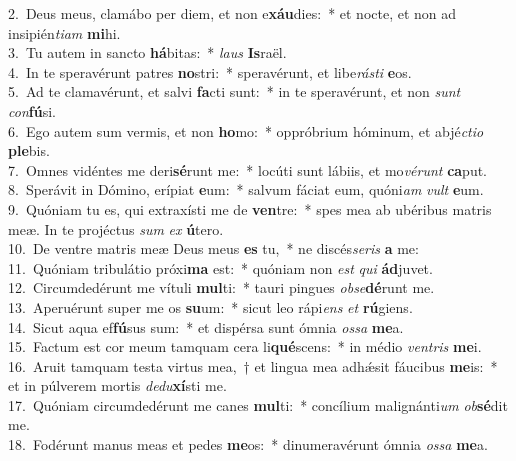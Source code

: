 {2.~}Deus meus, clamábo per diem, et non e\textbf{xáu}dies:~* et nocte, et non ad insipién\textit{ti}\textit{am} \textbf{mi}hi.\\
{3.~}Tu autem in sancto \textbf{há}bitas:~* \textit{laus} \textbf{Is}raël.\\
{4.~}In te speravérunt patres \textbf{no}stri:~* speravérunt, et libe\textit{rá}\textit{sti} \textbf{e}os.\\
{5.~}Ad te clamavérunt, et salvi \textbf{fa}cti sunt:~* in te speravérunt, et non \textit{sunt} \textit{con}\textbf{fú}si.\\
{6.~}Ego autem sum vermis, et non \textbf{ho}mo:~* oppróbrium hóminum, et abjé\textit{cti}\textit{o} \textbf{ple}bis.\\
{7.~}Omnes vidéntes me deri\textbf{sé}runt me:~* locúti sunt lábiis, et mo\textit{vé}\textit{runt} \textbf{ca}put.\\
{8.~}Sperávit in Dómino, erípiat \textbf{e}um:~* salvum fáciat eum, quóni\textit{am} \textit{vult} \textbf{e}um.\\
{9.~}Quóniam tu es, qui extraxísti me de \textbf{ven}tre:~* spes mea ab ubéribus matris meæ. In te projéctus \textit{sum} \textit{ex} \textbf{ú}tero.\\
{10.~}De ventre matris meæ Deus meus \textbf{es} tu,~* ne discés\textit{se}\textit{ris} \textbf{a} me:\\
{11.~}Quóniam tribulátio próxi\textbf{ma} est:~* quóniam non \textit{est} \textit{qui} \textbf{ád}juvet.\\
{12.~}Circumdedérunt me vítuli \textbf{mul}ti:~* tauri pingues \textit{ob}\textit{se}\textbf{dé}runt me.\\
{13.~}Aperuérunt super me os \textbf{su}um:~* sicut leo rápi\textit{ens} \textit{et} \textbf{rú}giens.\\
{14.~}Sicut aqua ef\textbf{fú}sus sum:~* et dispérsa sunt ómnia \textit{os}\textit{sa} \textbf{me}a.\\
{15.~}Factum est cor meum tamquam cera li\textbf{qué}scens:~* in médio \textit{ven}\textit{tris} \textbf{me}i.\\
{16.~}Aruit tamquam testa virtus mea,~† et lingua mea adhǽsit fáucibus \textbf{me}is:~* et in púlverem mortis \textit{de}\textit{du}\textbf{xí}sti me.\\
{17.~}Quóniam circumdedérunt me canes \textbf{mul}ti:~* concílium malignánti\textit{um} \textit{ob}\textbf{sé}dit me.\\
{18.~}Fodérunt manus meas et pedes \textbf{me}os:~* dinumeravérunt ómnia \textit{os}\textit{sa} \textbf{me}a.\\
